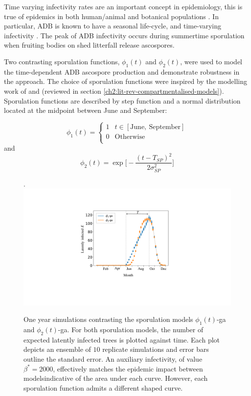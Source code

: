 Time varying infectivity rates are an important concept in epidemiology, this is true of epidemics in both human/animal \cite{svensson2007note, liu2012infectious} 
and botanical populations \cite{suffert2018some, leclerc2014estimating, time-varying-infectivity}.
In particular, ADB is known to have a seasonal life-cycle, and time-varying infectivity \cite{grosdidier2018tracking, hietala2013invasive}. 
The peak of ADB infectivity occurs during summertime sporulation when fruiting bodies on shed litterfall release ascospores.

Two contrasting sporulation functions, $\phi_1(t)$ and $\phi_2(t)$, were used to model the time-dependent ADB ascospore production and demonstrate robustness in the approach.
The choice of sporulation functions were inspired by the modelling work of \cite{time-varying-infectivity} and \cite{segarra2001epidemic}
(reviewed in section \ref{ch2:lit-rev-compartmentalised-models}). 
Sporulation functions are described by step function and a normal distribution located at the midpoint between June and September:

\begin{equation}
\phi_1(t)  = \left\{
\begin{array}{ll}
      1 &  t \in [\mathrm{June,\ September}] \\
      0 & \mathrm{Otherwise} \\
\end{array} 
\right.
\end{equation}
and 
\begin{equation}
     \phi_2(t) =  \exp\big[-\frac{(t - T_{SP})^2}{2\sigma_{SP}^2}\big]
\end{equation}

\begin{figure}.
    \centering
    \includegraphics[scale=0.35]{chapter6/figures/fig5-sporulation.pdf}
    \caption{One year simulations contrasting the sporulation models $\phi_1(t)$-ga and $\phi_2(t)$-ga. 
    For both sporulation models, the number of expected latently infected trees is plotted against time. Each plot depicts an ensemble of $10$ replicate simulations and error bars outline the standard error. An auxiliary infectivity, of value $\beta^*=2000$, effectively matches the epidemic impact between models\textemdash indicative of the area under each curve. However, each sporulation function admits a different shaped curve.}
    \label{fig:SEIR-sporulation}
\end{figure}

